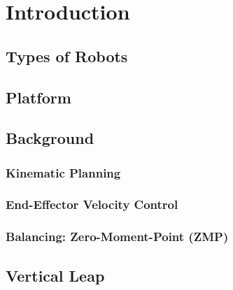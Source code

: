 \section{Introduction}
	
	\subsection{Types of Robots}
		
	\subsection{Platform}
		
	\subsection{Background}
		\subsubsection{Kinematic Planning}
			
		\subsubsection{End-Effector Velocity Control}
			
%			
		\subsubsection{Balancing: Zero-Moment-Point (ZMP)}
			
	\subsection{Vertical Leap}
		

%
%
%

%
%
%

%
%
%
